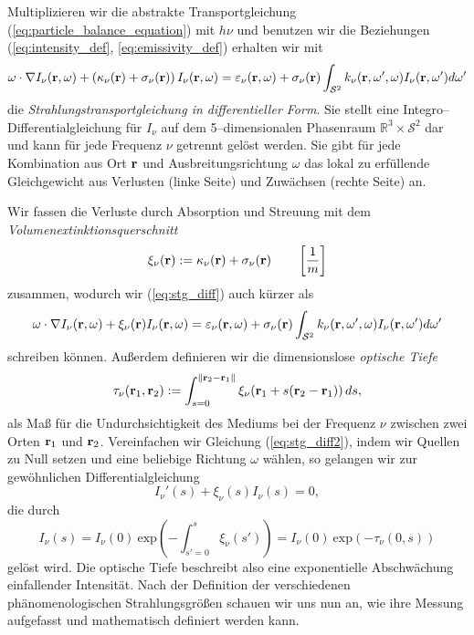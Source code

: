	Multiplizieren wir die abstrakte Transportgleichung (\ref{eq:particle_balance_equation}) mit $h\nu$ und benutzen wir die Beziehungen (\ref{eq:intensity_def}, \ref{eq:emissivity_def}) erhalten wir mit
	\begin{equation}\label{eq:stg_diff}
	  \omega\cdot\nabla I_\nu(\mathbf{r},\omega)+\left(\kappa_\nu(\mathbf{r})+\sigma_\nu(\mathbf{r})\right)I_\nu(\mathbf{r},\omega)
	  =\varepsilon_\nu(\mathbf{r},\omega)+\sigma_\nu(\mathbf{r})\int_{\mathcal{S}^2}k_\nu(\mathbf{r},\omega',\omega)I_\nu(\mathbf{r},\omega')d\omega'
	\end{equation}
	die {\em Strahlungstransportgleichung in differentieller Form}. Sie stellt eine In\-te\-gro--Dif\-fe\-ren\-ti\-al\-glei\-chung für $I_\nu$ auf dem 5--dimensionalen Phasenraum $\mathbb{R}^3 \times \mathcal{S}^2$ dar und kann für jede Frequenz $\nu$ getrennt gelöst werden. Sie gibt für jede Kombination aus Ort $\mathbf{r}$ und Ausbreitungsrichtung $\omega$ das lokal zu erfüllende Gleichgewicht aus Verlusten (linke Seite) und Zuwächsen (rechte Seite) an.
	
	Wir fassen die Verluste durch Absorption und Streuung mit dem {\em Vo\-lu\-men\-ex\-tink\-ti\-ons\-quer\-schnitt}
	$$\xi_\nu(\mathbf{r}):=\kappa_\nu(\mathbf{r})+\sigma_\nu(\mathbf{r}) \qquad\left[\frac{1}{m}\right]$$
	zusammen, wodurch wir (\ref{eq:stg_diff}) auch kürzer als
	\begin{equation}\label{eq:stg_diff2}
	  \omega\cdot\nabla I_\nu(\mathbf{r},\omega)+\xi_\nu(\mathbf{r})I_\nu(\mathbf{r},\omega)
	  =\varepsilon_\nu(\mathbf{r},\omega)+\sigma_\nu(\mathbf{r})\int_{\mathcal{S}^2}k_\nu(\mathbf{r},\omega',\omega)I_\nu(\mathbf{r},\omega')d\omega'
	\end{equation}
	schreiben können.
	Außerdem definieren wir die dimensionslose {\em optische Tiefe}
	\begin{equation*}
		\tau_\nu(\mathbf{r}_1,\mathbf{r}_2):=\int_{s=0}^{\|\mathbf{r}_2-\mathbf{r}_1\|} \xi_\nu(\mathbf{r}_1+s(\mathbf{r}_2 - \mathbf{r}_1))\,ds,
	\end{equation*}
	als Maß für die Undurchsichtigkeit des Mediums bei der Frequenz $\nu$ zwischen zwei Orten $\mathbf{r}_1$ und $\mathbf{r}_2$. Vereinfachen wir Gleichung (\ref{eq:stg_diff2}), indem wir Quellen zu Null setzen und eine beliebige Richtung $\omega$ wählen, so gelangen wir zur gewöhnlichen Differentialgleichung
	$$I_\nu'(s)+\xi_\nu(s)I_\nu(s)=0,$$
	die durch
	\begin{equation}
		I_\nu(s)=I_\nu(0)\:\text{exp}\left(-\int_{s'=0}^s \xi_\nu(s')\right)=I_\nu(0)\:\text{exp}\left(-\tau_\nu(0,s)\right)
		\label{eq:exponentialdecay}
	\end{equation}
	gelöst wird. Die optische Tiefe beschreibt also eine exponentielle Abschwächung einfallender Intensität. Nach der Definition der verschiedenen phänomenologischen Strahlungsgrößen schauen wir uns nun an, wie ihre Messung aufgefasst und mathematisch definiert werden kann.
	
